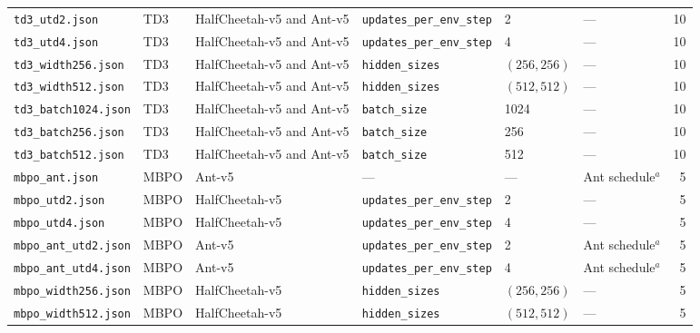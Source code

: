 {\begin{longtable}{@{}p{3.1cm}lp{1.9cm}p{2.3cm}lp{2.4cm}r@{}}
    \texttt{td3\_\allowbreak utd2.json} & TD3 & HalfCheetah-v5 and Ant-v5 & \texttt{updates\_\allowbreak per\_\allowbreak env\_\allowbreak step} & 2 & --- & \num{10} \\
    \texttt{td3\_\allowbreak utd4.json} & TD3 & HalfCheetah-v5 and Ant-v5 & \texttt{updates\_\allowbreak per\_\allowbreak env\_\allowbreak step} & 4 & --- & \num{10} \\
    \texttt{td3\_\allowbreak width256.json} & TD3 & HalfCheetah-v5 and Ant-v5 & \texttt{hidden\_\allowbreak sizes} & $(256,256)$ & --- & \num{10} \\
    \texttt{td3\_\allowbreak width512.json} & TD3 & HalfCheetah-v5 and Ant-v5 & \texttt{hidden\_\allowbreak sizes} & $(512,512)$ & --- & \num{10} \\
    \texttt{td3\_\allowbreak batch1024.json} & TD3 & HalfCheetah-v5 and Ant-v5 & \texttt{batch\_\allowbreak size} & 1024 & --- & \num{10} \\
    \texttt{td3\_\allowbreak batch256.json} & TD3 & HalfCheetah-v5 and Ant-v5 & \texttt{batch\_\allowbreak size} & 256 & --- & \num{10} \\
    \texttt{td3\_\allowbreak batch512.json} & TD3 & HalfCheetah-v5 and Ant-v5 & \texttt{batch\_\allowbreak size} & 512 & --- & \num{10} \\
    \texttt{mbpo\_\allowbreak ant.json} & MBPO & Ant-v5 & --- & --- & Ant schedule$^{a}$ & \num{5} \\
    \texttt{mbpo\_\allowbreak utd2.json} & MBPO & HalfCheetah-v5 & \texttt{updates\_\allowbreak per\_\allowbreak env\_\allowbreak step} & 2 & --- & \num{5} \\
    \texttt{mbpo\_\allowbreak utd4.json} & MBPO & HalfCheetah-v5 & \texttt{updates\_\allowbreak per\_\allowbreak env\_\allowbreak step} & 4 & --- & \num{5} \\
    \texttt{mbpo\_\allowbreak ant\_\allowbreak utd2.json} & MBPO & Ant-v5 & \texttt{updates\_\allowbreak per\_\allowbreak env\_\allowbreak step} & 2 & Ant schedule$^{a}$ & \num{5} \\
    \texttt{mbpo\_\allowbreak ant\_\allowbreak utd4.json} & MBPO & Ant-v5 & \texttt{updates\_\allowbreak per\_\allowbreak env\_\allowbreak step} & 4 & Ant schedule$^{a}$ & \num{5} \\
    \texttt{mbpo\_\allowbreak width256.json} & MBPO & HalfCheetah-v5 & \texttt{hidden\_\allowbreak sizes} & $(256,256)$ & --- & \num{5} \\
    \texttt{mbpo\_\allowbreak width512.json} & MBPO & HalfCheetah-v5 & \texttt{hidden\_\allowbreak sizes} & $(512,512)$ & --- & \num{5} \\

\end{longtable}}
